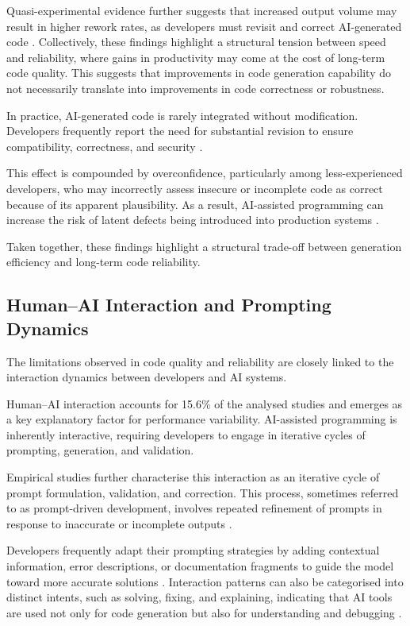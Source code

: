 \documentclass[conference]{IEEEtran}
\begin{document}
Quasi-experimental evidence further suggests that increased output volume may result in higher rework rates, as developers must revisit and correct AI-generated code \cite{xu_ai-assisted_2026}. Collectively, these findings highlight a structural tension between speed and reliability, where gains in productivity may come at the cost of long-term code quality. This suggests that improvements in code generation capability do not necessarily translate into improvements in code correctness or robustness.

In practice, AI-generated code is rarely integrated without modification. Developers frequently report the need for substantial revision to ensure compatibility, correctness, and security \cite{siddiq_quality_2024}.

This effect is compounded by overconfidence, particularly among less-experienced developers, who may incorrectly assess insecure or incomplete code as correct because of its apparent plausibility. As a result, AI-assisted programming can increase the risk of latent defects being introduced into production systems \cite{perry_users_2023}.

Taken together, these findings highlight a structural trade-off between generation efficiency and long-term code reliability.

\subsection{Human--AI Interaction and Prompting Dynamics}

The limitations observed in code quality and reliability are closely linked to the interaction dynamics between developers and AI systems.

Human--AI interaction accounts for 15.6\% of the analysed studies and emerges as a key explanatory factor for performance variability. AI-assisted programming is inherently interactive, requiring developers to engage in iterative cycles of prompting, generation, and validation.

Empirical studies further characterise this interaction as an iterative cycle of prompt formulation, validation, and correction. This process, sometimes referred to as prompt-driven development, involves repeated refinement of prompts in response to inaccurate or incomplete outputs \cite{fayed_prompt-driven_2026}.

Developers frequently adapt their prompting strategies by adding contextual information, error descriptions, or documentation fragments to guide the model toward more accurate solutions \cite{mendes_youre_2024}. Interaction patterns can also be categorised into distinct intents, such as solving, fixing, and explaining, indicating that AI tools are used not only for code generation but also for understanding and debugging \cite{rahe_how_2025}.
\end{document}

